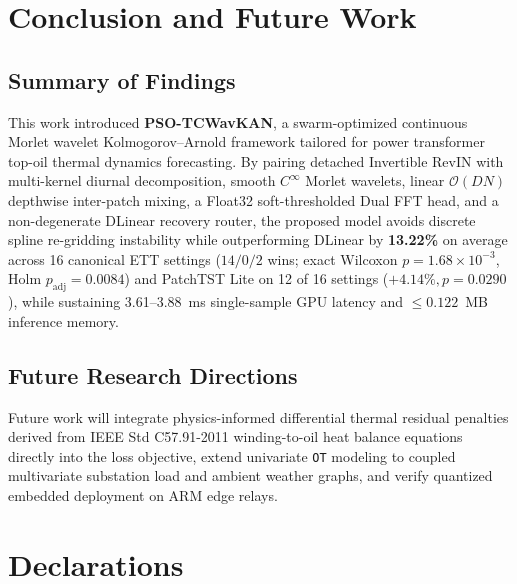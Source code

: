 \documentclass[pdflatex,sn-mathphys-num,referee,lineno]{sn-jnl}
\theoremstyle{thmstyleone}
\theoremstyle{thmstyletwo}
\theoremstyle{thmstylethree}
\begin{document}
\section{Conclusion and Future Work}\label{sec:conclusion}

\subsection{Summary of Findings}\label{subsec:concl_summary}
This work introduced \textbf{PSO-TCWavKAN}, a swarm-optimized continuous Morlet wavelet Kolmogorov--Arnold framework tailored for power transformer top-oil thermal dynamics forecasting. By pairing detached Invertible RevIN with multi-kernel diurnal decomposition, smooth $C^\infty$ Morlet wavelets, linear $\mathcal{O}(DN)$ depthwise inter-patch mixing, a Float32 soft-thresholded Dual FFT head, and a non-degenerate DLinear recovery router, the proposed model avoids discrete spline re-gridding instability while outperforming DLinear by \textbf{13.22\%} on average across 16 canonical ETT settings ($14/0/2$ wins; exact Wilcoxon $p = 1.68 \times 10^{-3}$, Holm $p_{\mathrm{adj}} = 0.0084$) and PatchTST Lite on 12 of 16 settings ($+4.14\%, p = 0.0290$), while sustaining 3.61--3.88~ms single-sample GPU latency and $\le 0.122$~MB inference memory.

\subsection{Future Research Directions}\label{subsec:future_work}
Future work will integrate physics-informed differential thermal residual penalties \cite{raissi2019pinn} derived from IEEE Std C57.91-2011 winding-to-oil heat balance equations directly into the loss objective, extend univariate \texttt{OT} modeling to coupled multivariate substation load and ambient weather graphs, and verify quantized embedded deployment on ARM edge relays.

\section*{Declarations}
\end{document}
